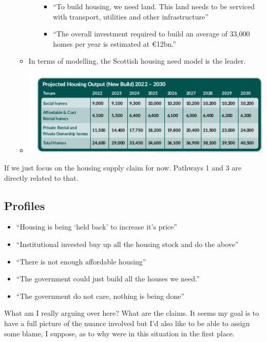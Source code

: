 \documentclass[11pt]{article}
\begin{document}
\begin{itemize}
\begin{itemize}
\begin{itemize}
      \begin{itemize}
      \tightlist
      \item
        ``To build housing, we need land. This land needs to be serviced
        with transport, utilities and other infrastructure''
      \item
        ``The overall investment required to build an average of 33,000
        homes per year is estimated at €12bn.''
      \end{itemize}
    \end{itemize}
  \item
    In terms of modelling, the Scottish housing need model is the
    leader.
  \item
    \includegraphics{img/housingdemandhndamodel.png}
  \end{itemize}
\end{itemize}

If we just focus on the housing supply claim for now. Pathways 1 and 3
are directly related to that.

\hypertarget{profiles}{%
\subsection{Profiles}\label{profiles}}

\begin{itemize}
\tightlist
\item
  ``Housing is being `held back' to increase it's price''
\item
  ``Institutional invested buy up all the housing stock and do the
  above''
\item
  ``There is not enough affordable housing''
\item
  ``The government could just build all the houses we need.''
\item
  ``The government do not care, nothing is being done''
\end{itemize}

What am I really arguing over here? What are the claims. It seems my
goal is to have a full picture of the nuance involved but I'd also like
to be able to assign some blame, I suppose, as to why were in this
situation in the first place.
\end{document}
